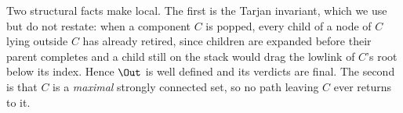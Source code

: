 \begin{algorithm}[!htb]
\DontPrintSemicolon
\SetAlgoLined
{}
\caption{Per-component elimination: the greatest fixpoint of \S\ref{ss:loop} restricted to $C$,
evaluated against the already-final verdicts in $\Out$.}\label{alg:elim}
\end{algorithm}


Two structural facts make \Eliminate{} local. The first is the Tarjan invariant, which we use but do
not restate: when a component $C$ is popped, every child of a node of $C$ lying outside $C$ has
already retired, since children are expanded before their parent completes and a child still on the
stack would drag the lowlink of $C$'s root below its index. Hence $\Out$ is well defined and its
verdicts are final. The second is that $C$ is a \emph{maximal} strongly connected set, so no path
leaving $C$ ever returns to it.

